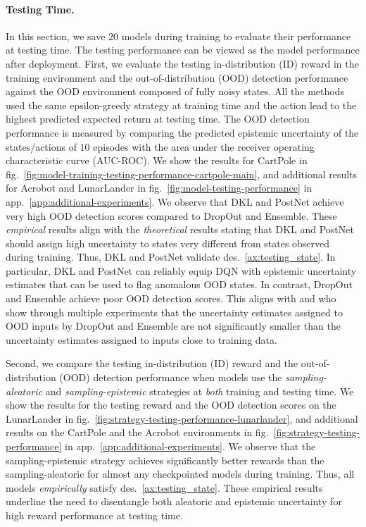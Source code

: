 
\paragraph{Testing Time.} In this section, we save $20$ models during training to evaluate their performance at testing time. The testing performance can be viewed as the model performance after deployment. First, we evaluate the testing in-distribution (ID) reward in the training environment and the out-of-distribution (OOD) detection performance against the OOD environment composed of fully noisy states. All the methods used the same epsilon-greedy strategy at training time and the action lead to the highest predicted expected return at testing time. The OOD detection performance is measured by comparing the predicted epistemic uncertainty of the states/actions of $10$ episodes with the area under the receiver operating characteristic curve (AUC-ROC). We show the results for CartPole in fig.~\ref{fig:model-training-testing-performance-cartpole-main}, and additional results for Acrobot and LunarLander in fig.~\ref{fig:model-testing-performance} in app.~\ref{app:additional-experiments}. We observe that DKL and PostNet achieve very high OOD detection scores compared to DropOut and Ensemble. These \emph{empirical} results align with the \emph{theoretical} results stating that DKL and PostNet should assign high uncertainty to states very different from states observed during training. Thus, DKL and PostNet validate des.~\ref{ax:testing_state}. In particular, DKL and PostNet can reliably equip DQN with epistemic uncertainty estimates that can be used to flag anomalous OOD states. In contrast, DropOut and Ensemble achieve poor OOD detection scores. This aligns with \citet{randomized-prior-functions} and \citet{natpn} who show through multiple experiments that the uncertainty estimates assigned to OOD inputs by DropOut and Ensemble are not significantly smaller than the uncertainty estimates assigned to inputs close to training data.

%
%
%

Second, we compare the testing in-distribution (ID) reward and the out-of-distribution (OOD) detection performance when models use the \emph{sampling-aleatoric} and \emph{sampling-epistemic} strategies at \emph{both} training and testing time. We show the results for the testing reward and the OOD detection scores on the LunarLander in fig.~\ref{fig:strategy-testing-performance-lunarlander}, and additional results on the CartPole and the Acrobot environments in fig.~\ref{fig:strategy-testing-performance} in app.~\ref{app:additional-experiments}. We observe that the sampling-epistemic strategy achieves significantly better rewards than the sampling-aleatoric for almost any checkpointed models during training. Thus, all models \emph{empirically} satisfy des.~\ref{ax:testing_state}. These empirical results underline the need to disentangle both aleatoric and epistemic uncertainty for high reward performance at testing time.


